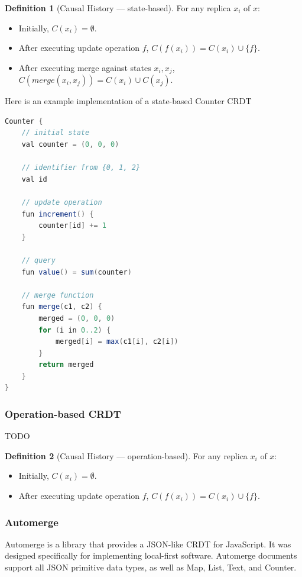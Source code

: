 \documentclass[a4paper, 11pt, oneside]{article}
\theoremstyle{definition}
\newtheorem{definition}{Definition}[section]
\begin{document}
\begin{definition}[Causal History — state-based]
    For any replica $x_i$ of $x$:
\begin{itemize}
    \item Initially, $C(x_i) = \emptyset$.
    \item After executing update operation $f$, $C(f(x_i)) = C(x_i) \cup \{f\}$.
    \item After executing merge against states $x_i, x_j$, $C(merge(x_i, x_j)) = C(x_i) \cup C(x_j)$.
\end{itemize}
\end{definition}

Here is an example implementation of a state-based Counter CRDT

\begin{lstlisting}[language=Java]
Counter {
    // initial state
    val counter = (0, 0, 0)

    // identifier from {0, 1, 2}
    val id

    // update operation
    fun increment() {
        counter[id] += 1
    }

    // query
    fun value() = sum(counter)

    // merge function
    fun merge(c1, c2) {
        merged = (0, 0, 0)
        for (i in 0..2) {
            merged[i] = max(c1[i], c2[i])
        }
        return merged
    }
}
\end{lstlisting}

\subsubsection{Operation-based CRDT}
TODO

\begin{definition}[Causal History — operation-based]
    For any replica $x_i$ of $x$:
\begin{itemize}
    \item Initially, $C(x_i) = \emptyset$.
    \item After executing update operation $f$, $C(f(x_i)) = C(x_i) \cup \{f\}$.
\end{itemize}
\end{definition}

\subsubsection{Automerge}
Automerge \cite{automerge} is a library that provides a JSON-like CRDT for JavaScript. It was designed specifically for implementing local-first software. Automerge documents support all JSON primitive data types, as well as Map, List, Text, and Counter. 
\end{document}
